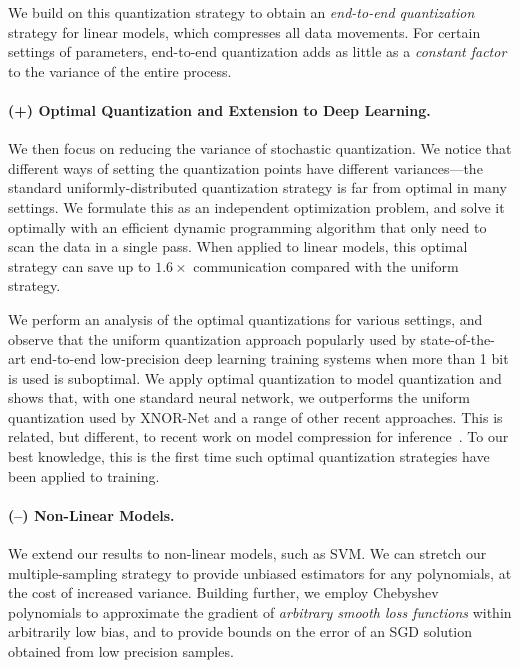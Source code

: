 \documentclass{article}
\begin{document}
\vspace{-0.5em}
We build on this quantization strategy to obtain an \emph{end-to-end quantization} strategy
for linear models, which compresses all data movements. 
For certain settings of parameters, end-to-end quantization adds as little as a \emph{constant factor} to the variance of the entire process. 

\vspace{-1.5em}
\paragraph{(+) Optimal Quantization and Extension to Deep Learning.}
We then focus on reducing the variance of  
stochastic quantization. We notice that different ways of setting the quantization points have different variances---the standard uniformly-distributed quantization strategy is far from optimal in many settings.
We formulate this as an independent optimization problem, and solve it optimally with 
an efficient dynamic programming algorithm 
that only need to scan the data in a single pass.
When applied to linear models, this optimal 
strategy can save up to $1.6\times$ communication
compared with the uniform strategy.

\vspace{-0.5em}
We perform an analysis of the optimal quantizations for various settings, and observe that the uniform quantization approach
popularly used by state-of-the-art end-to-end
low-precision deep learning training systems
when more than 1 bit is used is suboptimal.
We apply optimal quantization to 
model quantization and shows that, with one
standard neural network, we outperforms the
uniform quantization used by XNOR-Net and a
range of other recent approaches. This
is related, but different, to recent work 
on model compression for inference~\cite{Han:2016:ICLR}. 
To our best knowledge, this is the first time such optimal quantization strategies have been applied to training. 

\vspace{-1.5em}
\paragraph{(--) Non-Linear Models.} We extend our
results to non-linear models, such as SVM. We can stretch our multiple-sampling strategy to provide 
unbiased estimators for any polynomials, at the cost of increased variance. 
Building further, we employ Chebyshev polynomials to   
approximate the gradient of \emph{arbitrary smooth loss functions} within arbitrarily low bias, 
and to provide bounds on the error of an SGD solution obtained from low precision samples. 
\end{document}
